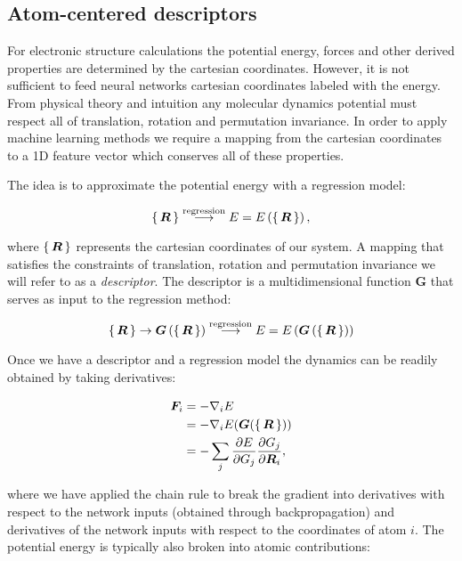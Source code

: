 \subsection{Atom-centered descriptors}
For electronic structure calculations the potential energy,
forces and other derived properties are determined by
the cartesian coordinates. However, it is not sufficient
to feed neural networks cartesian coordinates labeled with
the energy. From physical theory and intuition any molecular dynamics
potential must respect all of translation, rotation and permutation invariance.
In order to apply machine learning methods we require a mapping from
the cartesian coordinates to a 1D feature vector which conserves
all of these properties.
\par
The idea is to approximate the potential energy with a regression model:

\begin{equation}
\set{\bm{R}} \overset{\text{regression}}{\longrightarrow} 
E = E\left( \set{\bm{R}} \right) ,
\end{equation}

where $\set{\bm{R}}$ represents the cartesian coordinates of our system.
A mapping that satisfies the constraints of translation, rotation
and permutation invariance we will refer to as a \textit{descriptor}.
The descriptor is a multidimensional function $\bm{G}$
that serves as input to the regression method:

\begin{equation}
\set{\bm{R}} \rightarrow \bm{G} \left(\set{\bm{R}} \right)
\overset{\text{regression}}{\longrightarrow}
E = E \left(\bm{G}\left(\set{\bm{R}}\right)\right)
\end{equation}

Once we have a descriptor and a regression model the dynamics
can be readily obtained by taking derivatives:

\begin{equation}
\begin{split}
    \bm{F}_i &= -\nabla_i E \\
    &= -\nabla_i
    E(\bm{G}(\set{\bm{R}})) \\
    &= -\sum_j \frac{\partial E}
    {\partial G_j} \frac{\partial G_j}{\partial \bm{R}_i} ,
\end{split}
\end{equation}

where we have applied the chain rule to break the gradient
into derivatives with respect to the network inputs (obtained through
backpropagation) and derivatives of the network inputs with
respect to the coordinates of atom $i$.
The potential energy is typically also broken into
atomic contributions:


